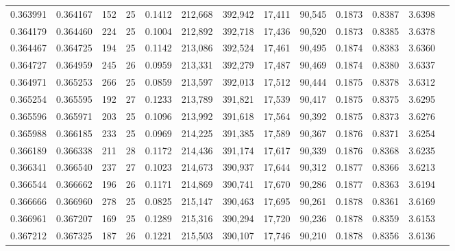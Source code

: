 \begin{tabular}{rrrrrrrrrrrrr}
0.363991 & 0.364167 &   152 &  25 &                                     0.1412 & 212,668 & 392,942 &  17,411 &  90,545 & 0.1873 & 0.8387 & 3.6398 \\
0.364179 & 0.364460 &   224 &  25 &                                     0.1004 & 212,892 & 392,718 &  17,436 &  90,520 & 0.1873 & 0.8385 & 3.6378 \\
0.364467 & 0.364725 &   194 &  25 &                                     0.1142 & 213,086 & 392,524 &  17,461 &  90,495 & 0.1874 & 0.8383 & 3.6360 \\
0.364727 & 0.364959 &   245 &  26 &                                     0.0959 & 213,331 & 392,279 &  17,487 &  90,469 & 0.1874 & 0.8380 & 3.6337 \\
0.364971 & 0.365253 &   266 &  25 &                                     0.0859 & 213,597 & 392,013 &  17,512 &  90,444 & 0.1875 & 0.8378 & 3.6312 \\
0.365254 & 0.365595 &   192 &  27 &                                     0.1233 & 213,789 & 391,821 &  17,539 &  90,417 & 0.1875 & 0.8375 & 3.6295 \\
0.365596 & 0.365971 &   203 &  25 &                                     0.1096 & 213,992 & 391,618 &  17,564 &  90,392 & 0.1875 & 0.8373 & 3.6276 \\
0.365988 & 0.366185 &   233 &  25 &                                     0.0969 & 214,225 & 391,385 &  17,589 &  90,367 & 0.1876 & 0.8371 & 3.6254 \\
0.366189 & 0.366338 &   211 &  28 &                                     0.1172 & 214,436 & 391,174 &  17,617 &  90,339 & 0.1876 & 0.8368 & 3.6235 \\
0.366341 & 0.366540 &   237 &  27 &                                     0.1023 & 214,673 & 390,937 &  17,644 &  90,312 & 0.1877 & 0.8366 & 3.6213 \\
0.366544 & 0.366662 &   196 &  26 &                                     0.1171 & 214,869 & 390,741 &  17,670 &  90,286 & 0.1877 & 0.8363 & 3.6194 \\
0.366666 & 0.366960 &   278 &  25 &                                     0.0825 & 215,147 & 390,463 &  17,695 &  90,261 & 0.1878 & 0.8361 & 3.6169 \\
0.366961 & 0.367207 &   169 &  25 &                                     0.1289 & 215,316 & 390,294 &  17,720 &  90,236 & 0.1878 & 0.8359 & 3.6153 \\
0.367212 & 0.367325 &   187 &  26 &                                     0.1221 & 215,503 & 390,107 &  17,746 &  90,210 & 0.1878 & 0.8356 & 3.6136 \\

\end{tabular}

